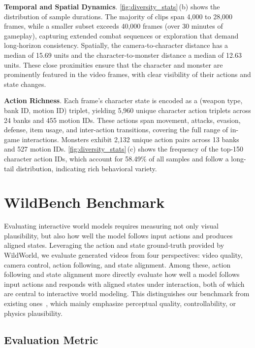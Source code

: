 \noindent
\textbf{Temporal and Spatial Dynamics}.
\cref{fig:diversity_stats}\,(b) shows the distribution of sample durations.
The majority of clips span 4,000 to 28,000 frames, while a smaller subset exceeds 40,000 frames (over 30 minutes of gameplay), capturing extended combat sequences or exploration that demand long-horizon consistency.
Spatially, the camera-to-character distance has a median of 15.69 units and the character-to-monster distance a median of 12.63 units. These close proximities ensure that the character and monster are prominently featured in the video frames, with clear visibility of their actions and state changes.

\noindent
\textbf{Action Richness}.
Each frame's character state is encoded as a (weapon type, bank ID, motion ID) triplet, yielding 5,960 unique character action triplets across 24 banks and 455 motion IDs.
These actions span movement, attacks, evasion, defense, item usage, and inter-action transitions, covering the full range of in-game interactions.
Monsters exhibit 2,132 unique action pairs across 13 banks and 527 motion IDs.
\cref{fig:diversity_stats}\,(c) shows the frequency of the top-150 character action IDs, which account for 58.49\% of all samples and follow a long-tail distribution, indicating rich behavioral variety.

\section{WildBench Benchmark}

Evaluating interactive world models requires measuring not only visual plausibility, but also how well the model follows input actions and produces aligned states.
Leveraging the action and state ground-truth provided by WildWorld, we evaluate generated videos from four perspectives: video quality, camera control, action following, and state alignment.
Among these, action following and state alignment more directly evaluate how well a model follows input actions and responds with aligned states under interaction, both of which are central to interactive world modeling.
This distinguishes our benchmark from existing ones~\cite{li2025worldmodelbench,duan2025worldscore,ye2026mind}, which mainly emphasize perceptual quality, controllability, or physics plausibility.

\subsection{Evaluation Metric}

